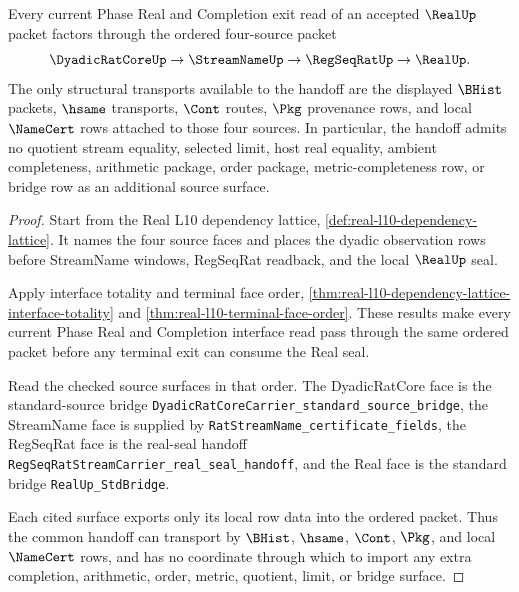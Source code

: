 \begin{theorem}
\label{thm:real-l10-four-source-audit-clean-handoff}
Every current Phase Real and Completion exit read of an accepted $\RealUp$
packet factors through the ordered four-source packet
$$
\DyadicRatCoreUp \to \StreamNameUp \to \RegSeqRatUp \to \RealUp.
$$
The only structural transports available to the handoff are the displayed
$\BHist$ packets, $\hsame$ transports, $\Cont$ routes, $\Pkg$ provenance
rows, and local $\NameCert$ rows attached to those four sources. In
particular, the handoff admits no quotient stream equality, selected limit,
host real equality, ambient completeness, arithmetic package, order package,
metric-completeness row, or bridge row as an additional source surface.
\end{theorem}
\begin{proof}
Start from the Real L10 dependency lattice,
\autoref{def:real-l10-dependency-lattice}. It names the four source faces and
places the dyadic observation rows before StreamName windows, RegSeqRat
readback, and the local $\RealUp$ seal.

Apply interface totality and terminal face order,
\autoref{thm:real-l10-dependency-lattice-interface-totality} and
\autoref{thm:real-l10-terminal-face-order}. These results make every current
Phase Real and Completion interface read pass through the same ordered packet
before any terminal exit can consume the Real seal.

Read the checked source surfaces in that order. The DyadicRatCore face is the
standard-source bridge \texttt{DyadicRatCoreCarrier\_standard\_source\_bridge},
the StreamName face is supplied by
\texttt{RatStreamName\_certificate\_fields}, the RegSeqRat face is the
real-seal handoff \texttt{RegSeqRatStreamCarrier\_real\_seal\_handoff}, and
the Real face is the standard bridge \texttt{RealUp\_StdBridge}.

Each cited surface exports only its local row data into the ordered packet.
Thus the common handoff can transport by $\BHist$, $\hsame$, $\Cont$, $\Pkg$,
and local $\NameCert$ rows, and has no coordinate through which to import any
extra completion, arithmetic, order, metric, quotient, limit, or bridge
surface.
\end{proof}


